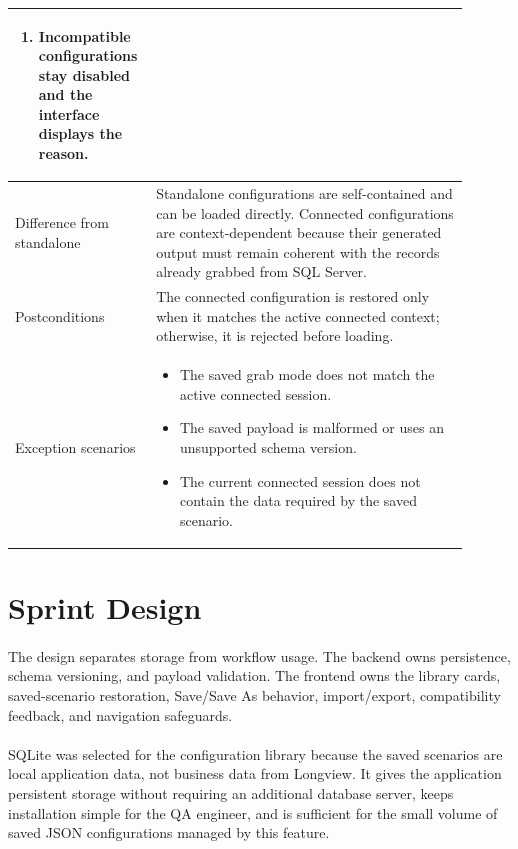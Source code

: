 \begin{longtable}{|P{0.24\linewidth}|P{0.66\linewidth}|}
\begin{enumerate}[leftmargin=*,nosep]
    \item Incompatible configurations stay disabled and the interface displays the reason.
\end{enumerate} \\
\hline
Difference from standalone & Standalone configurations are self-contained and can be loaded directly. Connected configurations are context-dependent because their generated output must remain coherent with the records already grabbed from SQL Server. \\
\hline
Postconditions & The connected configuration is restored only when it matches the active connected context; otherwise, it is rejected before loading. \\
\hline
Exception scenarios &
\begin{itemize}[leftmargin=*,nosep]
    \item The saved grab mode does not match the active connected session.
    \item The saved payload is malformed or uses an unsupported schema version.
    \item The current connected session does not contain the data required by the saved scenario.
\end{itemize} \\
\hline
\end{longtable}
\renewcommand{\arraystretch}{1}

\section{Sprint Design}

\paragraph{}The design separates storage from workflow usage. The backend owns persistence, schema
versioning, and payload validation. The frontend owns the library cards, saved-scenario restoration,
Save/Save As behavior, import/export, compatibility feedback, and navigation safeguards.

\paragraph{}SQLite was selected for the configuration library because the saved scenarios are local
application data, not business data from Longview. It gives the application persistent storage without
requiring an additional database server, keeps installation simple for the QA engineer, and is
sufficient for the small volume of saved JSON configurations managed by this feature.

